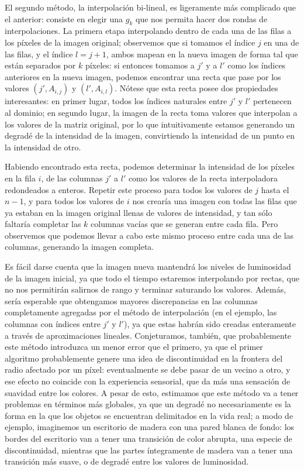 \documentclass{article}
\begin{document}
El segundo método, la interpolación bi-lineal, es ligeramente más complicado que el anterior: consiste en elegir una $g_k$ que nos permita hacer dos rondas de interpolaciones. La primera etapa interpolando dentro de cada una de las filas a los píxeles de la imagen original; observemos que si tomamos el índice $j$ en una de las filas, y el índice $l = j + 1$, ambos mapean en la nueva imagen de forma tal que están separados por $k$ píxeles: si entonces tomamos a $j'$ y a $l'$ como los índices anteriores en la nueva imagen, podemos encontrar una recta que pase por los valores $(j', A_{i, j})$ y $(l', A_{i, l})$. Nótese que esta recta posee dos propiedades interesantes: en primer lugar, todos los índices naturales entre $j'$ y $l'$ pertenecen al dominio; en segundo lugar, la imagen de la recta toma valores que interpolan a los valores de la matriz original, por lo que intuitivamente estamos generando un degradé de la intensidad de la imagen, convirtiendo la intensidad de un punto en la intensidad de otro. 

Habiendo encontrado esta recta, podemos determinar la intensidad de los píxeles en la fila $i$, de las columnas $j'$ a $l'$ como los valores de la recta interpoladora redondeados a enteros. Repetir este proceso para todos los valores de $j$ hasta el $n - 1$, y para todos los valores de $i$ nos crearía una imagen con todas las filas que ya estaban en la imagen original llenas de valores de intensidad, y tan sólo faltaría completar las $k$ columnas vacías que se generan entre cada fila. Pero observemos que podemos llevar a cabo este mismo proceso entre cada una de las columnas, generando la imagen completa.

Es fácil darse cuenta que la imagen nueva mantendrá los niveles de luminosidad de la imagen inicial, ya que todo el tiempo estaremos interpolando por rectas, que no nos permitirán salirnos de rango y terminar saturando los valores. Además, sería esperable que obtengamos mayores discrepancias en las columnas completamente agregadas por el método de interpolación (en el ejemplo, las columnas con índices entre $j'$ y $l'$), ya que estas habrán sido creadas enteramente a través de aproximaciones lineales. Conjeturamos, también, que probablemente este método introduzca un menor error que el primero, ya que el primer algoritmo probablemente genere una idea de discontinuidad en la frontera del radio afectado por un píxel: eventualmente se debe pasar de un vecino a otro, y ese efecto no coincide con la experiencia sensorial, que da más una sensación de suavidad entre los colores. A pesar de esto, estimamos que este método va a tener problemas en términos más globales, ya que un degradé no necesariamente es la forma en la que los objetos se encuentran delimitados en la vida real; a modo de ejemplo, imaginemos un escritorio de madera con una pared blanca de fondo: los bordes del escritorio van a tener una transición de color abrupta, una especie de discontinuidad, mientras que las partes íntegramente de madera van a tener una transición más suave, o de degradé entre los valores de luminosidad.
\end{document}
